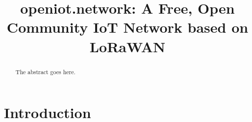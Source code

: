\documentclass[conference]{IEEEtran}
\begin{document}
\title{openiot.network: A Free, Open Community IoT Network based on LoRaWAN}


\author{
\IEEEauthorblockA{}
\and
{}
\IEEEauthorblockA{}
}


\maketitle

\begin{abstract}
The abstract goes here.
\end{abstract}





%
\IEEEpeerreviewmaketitle



\section{Introduction}
\end{document}
